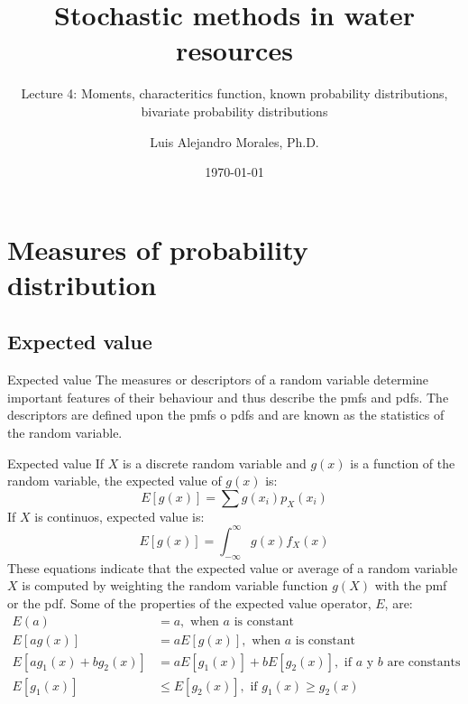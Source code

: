 \documentclass[8pt]{beamer}
\title{Stochastic methods in water resources}
\subtitle{Lecture 4: Moments, characteritics function, known probability distributions, bivariate probability distributions}
\author{Luis Alejandro Morales, Ph.D.}
\institute{Universidad Nacional de Colombia} %
\date{\today}
\renewcommand{\emph}[1]{\textcolor{myorange}{#1}}
\begin{document}
\begin{frame}
    \titlepage
\end{frame}

\section{Measures of probability distribution}
\subsection{Expected value}
\begin{frame}{Expected value}
    The measures or descriptors of a random variable determine important features of their behaviour and thus describe the \emph{pmfs} and \emph{pdfs}. The descriptors are defined upon the \emph{pmfs} o \emph{pdfs} and are known as the statistics of the random variable. 
    \begin{block}{Expected value}
        If $X$ is a discrete random variable and $g(x)$ is a function of the random variable, the \alert{expected value} of $g(x)$ is:
        \[
            E\left[g(x)\right] = \sum g(x_i) p_X(x_i)
        \]
        If $X$ is continuos, \alert{expected value} is:
        \[
            E\left[g(x)\right] = \int_{-\infty}^{\infty} g(x) f_X(x)
        \]
        These equations indicate that the expected value or average of a random variable $X$ is computed by weighting the random variable function $g(X)$ with the \emph{pmf} or the \emph{pdf}. Some of the properties of the expected value operator, $E$, are:
        \begin{align*}
            E(a) &= a, \text{ when $a$ is constant} \\
            E\left[a g(x) \right] &= a E\left[g(x) \right], \text{ when $a$ is constant} \\
            E\left[a g_1 (x) + b g_2 (x) \right] &= a E\left[g_1 (x) \right] + b E\left[g_2 (x) \right], \text{ if $a$ y $b$ are constants} \\
            E\left[g_1 (x) \right] &\leq E\left[g_2 (x) \right],  \text{ if $g_1(x) \geq g_2(x)$}
        \end{align*}
    \end{block}
\end{frame}
\end{document}
